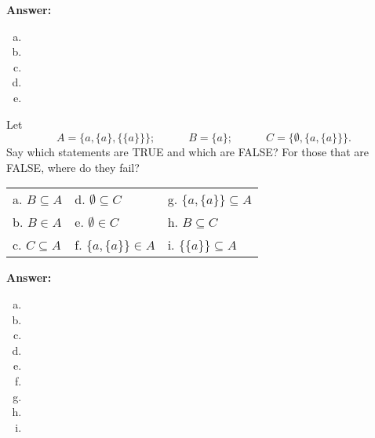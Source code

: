 \documentclass[addpoints,12pt]{exam}
\theoremstyle{remark}
\begin{document}
\begin{questions}

  {\bf Answer:} 
  \begin{enumerate}[(a)]
  \item
  \item
    \vskip3cm
  \item
    \vskip3cm
  \item
    \vskip3cm
  \item
    \vskip3cm
  \end{enumerate}

  \newpage

  \question[4] %
  Let 
  \[
    A = \{a, \{a\}, \{\{a\}\}\}; \quad\qquad B = \{a\}; \quad\qquad C = \{\emptyset, \{a,\{a\}\}\}.
  \]
  Say which statements are TRUE and which are FALSE?  For those that are FALSE, where do they fail?

  \begin{tabular}{lll}
    a. $B \subseteq A$  \phantom{XXXXXXXXX}& d. $\emptyset \subseteq C$\phantom{XXXXXXXXX}       & g. $ \{a, \{a\}\}\subseteq A$\\
    b. $B \in A$  & e. $\emptyset \in C$   & h. $ B\subseteq C$\\
    c. $C \subseteq A$  & f. $ \{a, \{a\}\}\in A$   & i. $ \{\{a\}\}\subseteq A$
  \end{tabular}

  {\bf Answer:} 
  \begin{enumerate}[(a)]
  \item
  \item
    \vskip1.2cm
  \item
    \vskip1.2cm
  \item
    \vskip1.2cm
  \item
    \vskip1.2cm
  \item
    \vskip1.2cm
  \item
    \vskip1.2cm
  \item
    \vskip1.2cm
  \item
    \vskip1.2cm
  \end{enumerate}


\end{questions}
\end{document}
